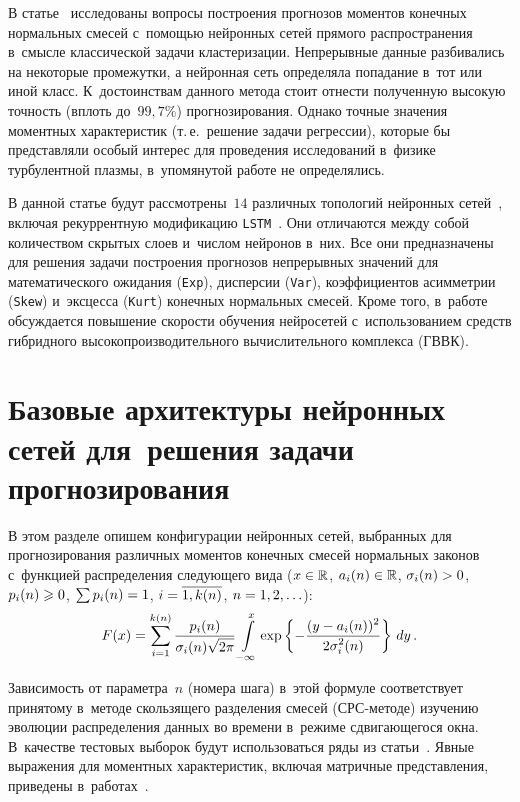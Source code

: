 \begin{multicols}{2}
В статье~\cite{Gorshenin2019b} исследованы вопросы построения прогнозов 
моментов конечных нормальных смесей с~помощью нейронных сетей прямого 
распространения в~смысле классической задачи кластеризации. Непрерывные 
данные разбивались на некоторые промежутки, а нейронная сеть определяла 
попадание в~тот или иной класс. К~достоинствам данного метода стоит отнести 
полученную высокую точность (вплоть до~$99{,}7\%$) прогнозирования. Однако
 точные значения моментных характеристик (т.\,е.\ решение задачи регрессии), 
 которые бы представляли особый интерес для проведения исследований в~физике 
 турбулентной плазмы, в~упомянутой работе не определялись.

В данной статье будут рассмотрены~$14$ различных топологий
нейронных сетей~\cite{Buduma2017}, 
включая рекуррентную модификацию \verb"LSTM"~\cite{Greff2017}.
Они отличаются между собой количеством скрытых слоев и~числом 
нейронов в~них. Все они предназначены для решения задачи построения прогнозов 
непрерывных значений для математического ожидания (\verb"Exp"), 
дисперсии (\verb"Var"), коэффициентов асим\-мет\-рии (\verb"Skew") и~эксцесса 
(\verb"Kurt") конечных нормальных смесей. Кроме того, в~работе обсуждается 
повышение скорости обучения нейросетей с~использованием средств гибридного 
высокопроизводительного вычислительного комплекса (ГВВК).


\section{Базовые архитектуры нейронных сетей для~решения задачи прогнозирования}

В этом разделе опишем конфигурации нейронных сетей, выбранных 
для прогнозирования различных моментов конечных смесей нормальных законов с~функцией 
распределения следующего вида ($x \hm\in \R$, $a_i(n)\hm\in\R$, $\sigma_i(n)\hm>0$, 
$p_{i}(n)\hm\geqslant 0$, $\sum p_{i}(n)\hm=1$, $i\hm=\overline{1,k(n)}$, 
$n\hm=1,2,\ldots$):
\begin{equation*}
\label{Mixture}
F(x)=\sum\limits_{i=1}^{k(n)}
\displaystyle\frac{\displaystyle p_i(n)\mathstrut}{\displaystyle \sigma_i(n)\sqrt{2\pi}\mathstrut}\int\limits_{-\infty}^{x}
\exp\left\{-\displaystyle\frac{\displaystyle (y-a_i(n))^2\mathstrut}{\displaystyle 2\sigma_i^2(n)\mathstrut}\right\}\,dy\,.
\end{equation*}

Зависимость от параметра~$n$ (номера шага) в~этой формуле соответствует 
принятому в~методе скользящего разделения смесей (СРС-ме\-то\-де) 
изучению эволюции распределения данных во времени в~режиме сдвигающегося окна. 
В~качестве тестовых выборок будут использоваться ряды из статьи~\cite{Gorshenin2019a}.
 Явные выражения для моментных характеристик, включая матричные представления, 
 приведены в~работах~\cite{Gorshenin2016a,Gorshenin2019b}.


\end{multicols}

